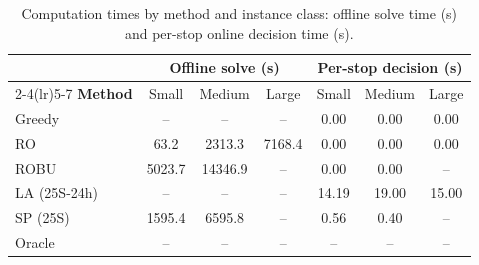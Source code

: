 \begin{table}[htbp]
\centering
\caption{Computation times by method and instance class: offline solve time (s) and per-stop online decision time (s).}
\label{tab:runtime}
\begin{tabular}{lcccccc}
\toprule
& \multicolumn{3}{c}{\textbf{Offline solve (s)}} & \multicolumn{3}{c}{\textbf{Per-stop decision (s)}}\\
\cmidrule(lr){2-4}\cmidrule(lr){5-7}
\textbf{Method} & Small & Medium & Large & Small & Medium & Large\\
\midrule
Greedy & -- & -- & -- & 0.00 & 0.00 & 0.00 \\
RO & 63.2 & 2313.3 & 7168.4 & 0.00 & 0.00 & 0.00 \\
ROBU & 5023.7 & 14346.9 & -- & 0.00 & 0.00 & -- \\
LA (25S-24h) & -- & -- & -- & 14.19 & 19.00 & 15.00 \\
SP (25S) & 1595.4 & 6595.8 & -- & 0.56 & 0.40 & -- \\
Oracle & -- & -- & -- & -- & -- & -- \\
\bottomrule
\end{tabular}
\end{table}
